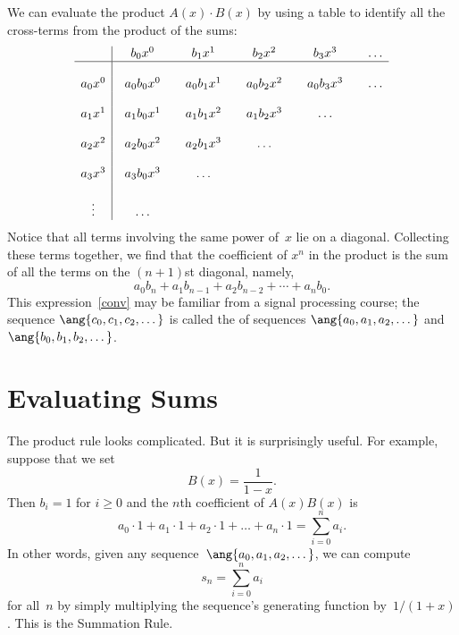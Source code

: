 We can evaluate the product $A(x) \cdot B(x)$ by using a table to identify
all the cross-terms from the product of the sums:
%
\[
\begin{array}{c|@{\quad}c@{\qquad}c@{\qquad}c@{\qquad}c@{\qquad}c}
        & b_0 x^0 & b_1 x^1 & b_2 x^2 & b_3 x^3 & \dots \\
\hline
\\
a_0 x^0 & a_0 b_0 x^0 & a_0 b_1 x^1 & a_0 b_2 x^2 & a_0 b_3 x^3 & \dots \\
\\
a_1 x^1 & a_1 b_0 x^1 & a_1 b_1 x^2 & a_1 b_2 x^3 & \dots \\
\\
a_2 x^2 & a_2 b_0 x^2 & a_2 b_1 x^3 & \dots \\
\\
a_3 x^3 & a_3 b_0 x^3 & \dots \\
\\
\vdots & \dots\\
\end{array}
\]
%
Notice that all terms involving the same power of~$x$ lie on a
diagonal.  Collecting these terms together, we find that the
coefficient of $x^n$ in the product is the sum of all the terms on the
$(n+1)$st diagonal, namely,
\begin{equation}\label{conv}
a_0 b_n + a_1 b_{n-1} + a_2 b_{n-2} + \cdots + a_n b_0.
\end{equation}
This expression~\eqref{conv} may be familiar from a signal processing
course; the sequence $\ang{c_0, c_1, c_2, \dots}$ is called the
 of sequences $\ang{a_0, a_1, a_2, \dots}$ and
$\ang{b_0, b_1, b_2, \dots}$.

\section{Evaluating Sums}

The product rule looks complicated.  But it is surprisingly useful.
For example, suppose that we set
\begin{equation*}
    B(x) = \frac{1}{1 - x}.
\end{equation*}
Then $b_i = 1$ for $i \ge 0$ and the $n$th coefficient of $A(x) B(x)$
is
\begin{equation*}
a_0 \cdot 1 + a_1 \cdot 1 + a_2 \cdot 1 + \dots + a_n \cdot 1
    = \sum_{i = 0}^n a_i.
\end{equation*}
In other words, given any sequence~$\ang{a_0, a_1, a_2, \dots}$, we can
compute
\begin{equation*}
    s_n = \sum_{i = 0}^n a_i
\end{equation*}
%
for all~$n$ by simply multiplying the sequence's generating function
by~$1/(1 + x)$.  This is the Summation Rule.

